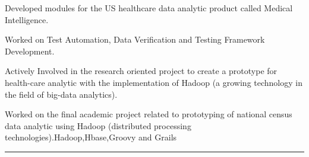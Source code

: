 \documentclass[]{deedy-resume-openfont}
\begin{document}
\begin{tightemize}
\item Developed modules for the US healthcare data analytic product called Medical Intelligence.
\item Worked on Test Automation, Data Verification and Testing Framework Development.
\item Actively Involved in the research oriented project to create a prototype for health-care analytic with the implementation of Hadoop (a growing technology in the field of big-data analytics).
\end{tightemize}
\sectionsep

\begin{tightemize}
\item Worked on the final academic project related to prototyping of national census data analytic using Hadoop (distributed processing technologies).Hadoop,Hbase,Groovy and Grails
\end{tightemize}
\rule[2.5mm]{\textwidth}{0.4pt}



\end{document}
